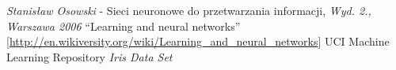 \documentclass{classrep}
\begin{document}
\clearpage

\begin{thebibliography}{0}
   \textsl{Stanisław Osowski} - Sieci neuronowe do przetwarzania informacji, \textsl{Wyd. 2., Warszawa 2006}
   ``Learning and neural networks'' [\url{http://en.wikiversity.org/wiki/Learning_and_neural_networks}]
   UCI Machine Learning Repository \textsl{Iris Data Set}
\end{thebibliography}
\end{document}
